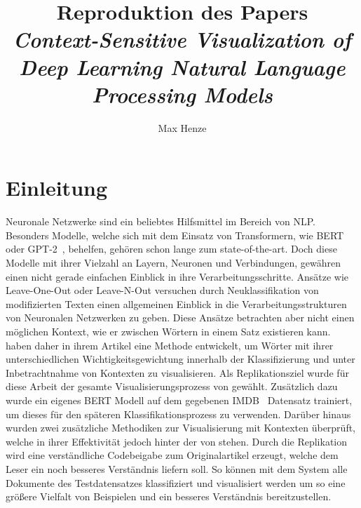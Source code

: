 \documentclass[DIV=13,fontsize=11pt]{scrartcl}
\begin{document}
\subject{Projektbericht zum Modul Data Mining Wintersemester 20221/2022}
\title{Reproduktion des Papers \\ \textit{Context-Sensitive Visualization of Deep Learning Natural Language Processing Models}\cite{dunn2021context}}
\author{Max Henze}%
\maketitle%

\section{Einleitung}

Neuronale Netzwerke sind ein beliebtes Hilfsmittel im Bereich von NLP.
Besonders Modelle, welche sich mit dem Einsatz von Transformern,
wie BERT~\cite{devlin2018bert} oder GPT-2~\cite{radford2019language}, behelfen,
gehören schon lange zum state-of-the-art. Doch diese Modelle mit ihrer
Vielzahl an Layern, Neuronen und Verbindungen, gewähren einen nicht
gerade einfachen Einblick in ihre Verarbeitungsschritte. Ansätze wie Leave-One-Out
oder Leave-N-Out versuchen durch Neuklassifikation von modifizierten Texten einen
allgemeinen Einblick in die Verarbeitungsstrukturen von Neuronalen Netzwerken zu geben.
Diese Ansätze betrachten aber nicht einen möglichen Kontext, wie er zwischen
Wörtern in einem Satz existieren kann.
\citeauthor{dunn2021context} haben daher in ihrem Artikel 
eine Methode entwickelt, um Wörter mit ihrer unterschiedlichen Wichtigkeitsgewichtung
innerhalb der Klassifizierung und unter Inbetrachtnahme von Kontexten zu visualisieren.
Als Replikationsziel wurde für diese Arbeit der gesamte Visualisierungsprozess
von \citeauthor{dunn2021context} gewählt. Zusätzlich dazu wurde ein eigenes
BERT Modell auf dem gegebenen IMDB~\cite{maas-EtAl:2011:ACL-HLT2011} Datensatz trainiert, um
dieses für den späteren Klassifikationsprozess zu verwenden. Darüber hinaus
wurden zwei zusätzliche Methodiken zur Visualisierung mit Kontexten überprüft,
welche in ihrer Effektivität jedoch hinter der von \citeauthor{dunn2021context}
stehen.
Durch die Replikation wird eine verständliche Codebeigabe zum Originalartikel
erzeugt, welche dem Leser ein noch besseres Verständnis liefern soll. So können
mit dem System alle Dokumente des Testdatensatzes klassifiziert und visualisiert werden
um so eine größere Vielfalt von Beispielen und ein besseres Verständnis bereitzustellen.
\end{document}

